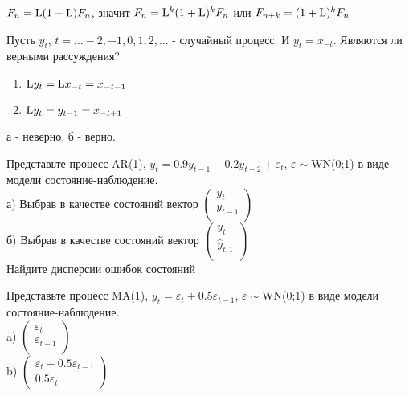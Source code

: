 \documentclass[pdftex,11pt,openany]{book}\usepackage[]{graphicx}\usepackage[]{color}
\begin{document}
\begin{solution}
$ F_{n}=\mathrm{L} (1+\mathrm{L} )F_{n} $, значит $ F_{n}=\mathrm{L} ^{k}(1+\mathrm{L} )^{k}F_{n} $ или $ F_{n+k}=(1+\mathrm{L} )^{k}F_{n} $
\end{solution}



\begin{problem}
Пусть $y_{t}$, $t=...-2,-1,0,1,2,...$ - случайный процесс. И $y_{t}=x_{-t}$. Являются ли верными рассуждения?
\begin{enumerate}
\item $\mathrm{L} y_{t}=\mathrm{L} x_{-t}=x_{-t-1}$
\item $\mathrm{L} y_{t}=y_{t-1}=x_{-t+1}$ 
\end{enumerate}
\end{problem}

\begin{solution}
а - неверно, б - верно. 
\end{solution}





\begin{problem}
Представьте процесс AR(1),
$y_{t}=0.9y_{t-1}-0.2y_{t-2}+\varepsilon_{t}$,
$\varepsilon\sim$WN(0;1) в виде модели состояние-наблюдение. \\
а) Выбрав в качестве состояний вектор $\left(%
\begin{array}{c}
  y_{t} \\
  y_{t-1} \\
\end{array}%
\right)$ \\
б) Выбрав в качестве состояний вектор $\left(%
\begin{array}{c}
  y_{t} \\
  \hat{y}_{t,1} \\
\end{array}%
\right)$ \\
Найдите дисперсии ошибок состояний 
\end{problem}

\begin{solution}
\end{solution}

\begin{problem}
Представьте процесс MA(1),
$y_{t}=\varepsilon_{t}+0.5\varepsilon_{t-1}$,
$\varepsilon\sim$WN(0;1) в виде модели состояние-наблюдение. \\
a) $\left(%
\begin{array}{c}
  \varepsilon_{t} \\
  \varepsilon_{t-1} \\
\end{array}%
\right)$ \\
b) $\left(%
\begin{array}{c}
  \varepsilon_{t}+0.5\varepsilon_{t-1} \\
  0.5\varepsilon_{t} 
\end{array}%
\right)$ 
\end{problem}
\end{document}
